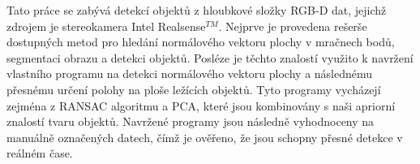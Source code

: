 \begin{abstract-czech}
    Tato práce se zabývá detekcí objektů z hloubkové složky RGB-D dat, jejichž zdrojem je stereokamera Intel\textregistered{} Realsense$^{TM}$. Nejprve je provedena rešerše dostupných metod pro hledání normálového vektoru plochy v mračnech bodů, segmentaci obrazu a detekci objektů. Posléze je těchto znalostí využito k navržení vlastního programu na detekci normálového vektoru plochy a následnému přesnému určení polohy na ploše ležících objektů. Tyto programy vycházejí zejména z RANSAC algoritmu a PCA, které jsou kombinovány s naši apriorní znalostí tvaru objektů. Navržené programy jsou následně vyhodnoceny na manuálně označených datech, čímž je ověřeno, že jsou schopny přesné detekce v reálném čase.
\end{abstract-czech}

